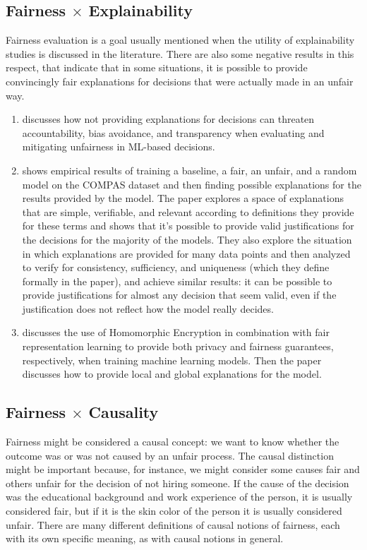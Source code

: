 \subsection{Fairness $\times$ Explainability}

Fairness evaluation is a goal usually mentioned when the utility of explainability studies is discussed in the literature\cite{rueda2022just}. There are also some negative results in this respect, that indicate that in some situations, it is possible to provide convincingly fair explanations for decisions that were actually made in an unfair way\cite{ExplainAll}.

\begin{enumerate}
\item \cite{rueda2022just} discusses how not providing explanations for decisions can threaten accountability, bias avoidance, and transparency when evaluating and mitigating unfairness in ML-based decisions.
\item \cite{ExplainAll} shows empirical results of training a baseline, a fair, an unfair, and a random model on the COMPAS\cite{Compass} dataset and then finding possible explanations for the results provided by the model. The paper explores a space of explanations that are simple, verifiable, and relevant according to definitions they provide for these terms and shows that it's possible to provide valid justifications for the decisions for the majority of the models. They also explore the situation in which explanations are provided for many data points and then analyzed to verify for consistency, sufficiency, and uniqueness (which they define formally in the paper), and achieve similar results: it can be possible to provide justifications for almost any decision that seem valid, even if the justification does not reflect how the model really decides.
\item \cite{franco2021toward} discusses the use of Homomorphic Encryption in combination with fair representation learning \cite{zemel2013learning} to provide both privacy and fairness guarantees, respectively, when training machine learning models. Then the paper discusses how to provide local and global explanations for the model.
\end{enumerate}

\subsection{Fairness $\times$ Causality}

Fairness might be considered a causal concept: we want to know whether the outcome was or was not caused by an unfair process. The causal distinction might be important because, for instance, we might consider some causes fair and others unfair for the decision of not hiring someone. If the cause of the decision was the educational background and work experience of the person, it is usually considered fair, but if it is the skin color of the person it is usually considered unfair. There are many different definitions of causal notions of fairness, each with its own specific meaning, as with causal notions in general.

